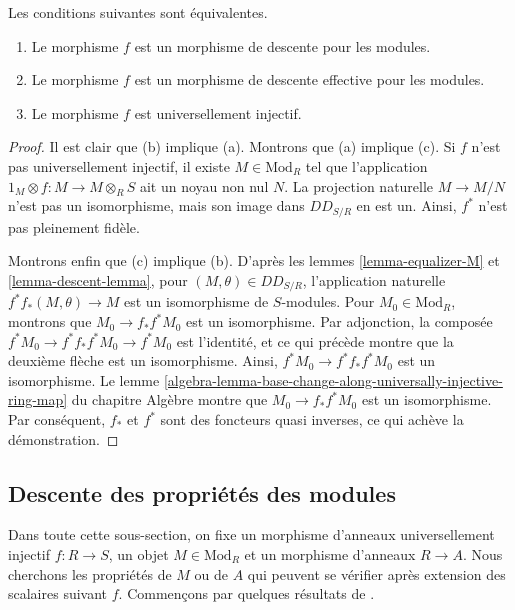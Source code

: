\begin{theorem}
\label{theorem-descent}
Les conditions suivantes sont équivalentes.
\begin{enumerate}
\item[(a)] Le morphisme $f$ est un morphisme de descente pour les modules.
\item[(b)] Le morphisme $f$ est un morphisme de descente effective pour les modules.
\item[(c)] Le morphisme $f$ est universellement injectif.
\end{enumerate}
\end{theorem}

\begin{proof}
Il est clair que (b) implique (a). Montrons que (a) implique (c).
Si $f$ n'est pas universellement injectif, il existe
$M \in \text{Mod}_R$ tel que l'application
$1_M \otimes f: M \to M \otimes_R S$ ait un noyau non nul $N$.
La projection naturelle $M \to M/N$ n'est pas un isomorphisme,
mais son image dans $DD_{S/R}$ en est un.
Ainsi, $f^*$ n'est pas pleinement fidèle.

\medskip\noindent
Montrons enfin que (c) implique (b). D'après les lemmes
\ref{lemma-equalizer-M} et \ref{lemma-descent-lemma}, pour
$(M, \theta) \in DD_{S/R}$, l'application naturelle
$f^* f_*(M,\theta) \to M$ est un isomorphisme de $S$-modules.
Pour $M_0 \in \text{Mod}_R$, montrons que $M_0 \to f_*f^*M_0$
est un isomorphisme. Par adjonction, la composée
$f^*M_0 \to f^*f_*f^*M_0 \to f^*M_0$ est l'identité, et ce qui précède
montre que la deuxième flèche est un isomorphisme. Ainsi,
$f^*M_0 \to f^*f_*f^*M_0$ est un isomorphisme. Le lemme
\ref{algebra-lemma-base-change-along-universally-injective-ring-map}
du chapitre Algèbre montre que $M_0 \to f_* f^* M_0$ est un isomorphisme.
Par conséquent, $f_*$ et $f^*$ sont des foncteurs quasi inverses,
ce qui achève la démonstration.
\end{proof}

\subsection{Descente des propriétés des modules}
\label{subsection-descent-properties-modules}

\noindent
Dans toute cette sous-section, on fixe un morphisme d'anneaux
universellement injectif $f : R \to S$, un objet $M \in \text{Mod}_R$
et un morphisme d'anneaux $R \to A$. Nous cherchons les propriétés de
$M$ ou de $A$ qui peuvent se vérifier après extension des scalaires
suivant $f$. Commençons par quelques résultats de \cite{mesablishvili2}.


